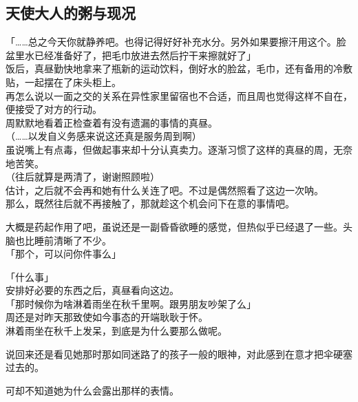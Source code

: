 \subsection{天使大人的粥与现况}

「……总之今天你就静养吧。也得记得好好补充水分。另外如果要擦汗用这个。脸盆里水已经准备好了，把毛巾放进去然后拧干来擦就好了」\\

饭后，真昼勤快地拿来了瓶新的运动饮料，倒好水的脸盆，毛巾，还有备用的冷敷贴，一起摆在了床头柜上。\\

再怎么说以一面之交的关系在异性家里留宿也不合适，而且周也觉得这样不自在，便接受了对方的行动。\\

周默默地看着正检查着有没有遗漏的事情的真昼。\\

（……以发自义务感来说这还真是服务周到啊）\\

虽说嘴上有点毒，但做起事来却十分认真卖力。逐渐习惯了这样的真昼的周，无奈地苦笑。\\

（往后就算是两清了，谢谢照顾啦）\\

估计，之后就不会再和她有什么关连了吧。不过是偶然照看了这边一次呐。\\

那么，既然往后就不再接触了，那就趁这个机会问下在意的事情吧。

大概是药起作用了吧，虽说还是一副昏昏欲睡的感觉，但热似乎已经退了一些。头脑也比睡前清晰了不少。\\

「那个，可以问你件事么」

「什么事」\\

安排好必要的东西之后，真昼看向这边。\\

「那时候你为啥淋着雨坐在秋千里啊。跟男朋友吵架了么」\\

周还是对昨天那致使如今事态的开端耿耿于怀。\\

淋着雨坐在秋千上发呆，到底是为什么要那么做呢。

说回来还是看见她那时那如同迷路了的孩子一般的眼神，对此感到在意才把伞硬塞过去的。

可却不知道她为什么会露出那样的表情。\\

